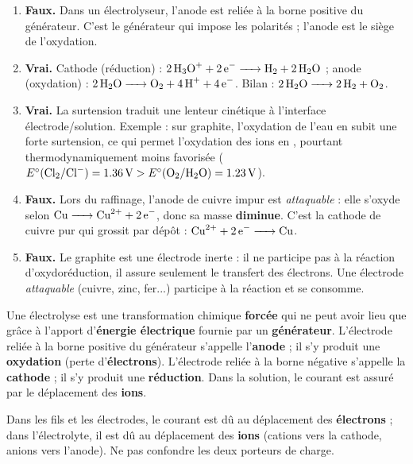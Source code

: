 \documentclass[11pt]{article}
\newcommand{\cle}[1]{{\popxbold\color{popdark}#1}}
\begin{document}
\begin{corrige}
\begin{enumerate}
\item \textbf{Faux.} Dans un électrolyseur, l'\cle{anode} est reliée à la \cle{borne positive} du générateur. C'est le générateur qui impose les polarités ; l'anode est le siège de l'oxydation.
\item \textbf{Vrai.} Cathode (réduction) : $\ce{2H3O+ + 2e- -> H2 + 2H2O}$ ; anode (oxydation) : $\ce{2H2O -> O2 + 4H+ + 4e-}$. Bilan : $\ce{2H2O -> 2H2 + O2}$.
\item \textbf{Vrai.} La \cle{surtension} traduit une lenteur cinétique à l'interface électrode/solution. Exemple : sur graphite, l'oxydation de l'eau en  subit une forte surtension, ce qui permet l'oxydation des ions  en , pourtant thermodynamiquement moins favorisée ($E^\circ(\ce{Cl2}/\ce{Cl-}) = \SI{1,36}{V} > E^\circ(\ce{O2}/\ce{H2O}) = \SI{1,23}{V}$).
\item \textbf{Faux.} Lors du raffinage, l'anode de cuivre impur est \emph{attaquable} : elle s'oxyde selon $\ce{Cu -> Cu^2+ + 2e-}$, donc sa masse \textbf{diminue}. C'est la cathode de cuivre pur qui grossit par dépôt : $\ce{Cu^2+ + 2e- -> Cu}$.
\item \textbf{Faux.} Le graphite est une électrode \cle{inerte} : il ne participe pas à la réaction d'oxydoréduction, il assure seulement le transfert des électrons. Une électrode \emph{attaquable} (cuivre, zinc, fer...) participe à la réaction et se consomme.
\end{enumerate}
\end{corrige}

\begin{corrige}
Une électrolyse est une transformation chimique \textbf{forcée} qui ne peut avoir lieu que grâce à l'apport d'\textbf{énergie électrique} fournie par un \textbf{générateur}. L'électrode reliée à la borne positive du générateur s'appelle l'\textbf{anode} ; il s'y produit une \textbf{oxydation} (perte d'\textbf{électrons}). L'électrode reliée à la borne négative s'appelle la \textbf{cathode} ; il s'y produit une \textbf{réduction}. Dans la solution, le courant est assuré par le déplacement des \textbf{ions}.
\end{corrige}

\begin{attention}
Dans les fils et les électrodes, le courant est dû au déplacement des \textbf{électrons} ; dans l'électrolyte, il est dû au déplacement des \textbf{ions} (cations vers la cathode, anions vers l'anode). Ne pas confondre les deux porteurs de charge.
\end{attention}
\end{document}
